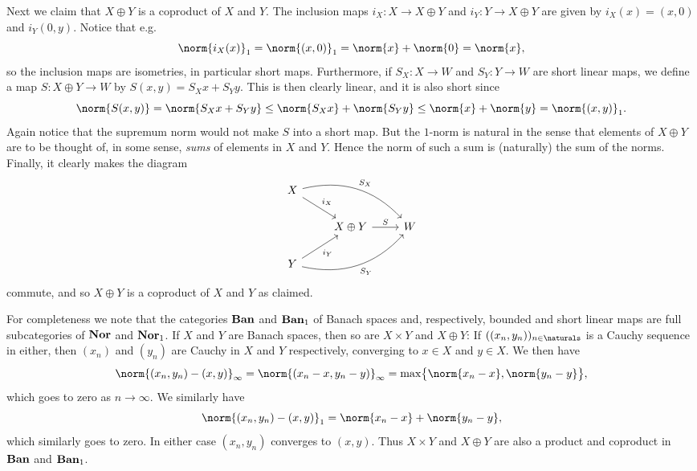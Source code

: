 \documentclass[article, a4paper, 11pt, oneside]{memoir}
\numberwithin{equation}{chapter}
\theoremstyle{nonumberplain}
\begin{document}
\begin{remarkbreak}
	Next we claim that $X \oplus Y$ is a coproduct of $X$ and $Y$. The inclusion maps $i_X \colon X \to X \oplus Y$ and $i_Y \colon Y \to X \oplus Y$ are given by $i_X(x) = (x,0)$ and $i_Y(0,y)$. Notice that e.g.
	\begin{equation*}
		\norm{i_X(x)}_1
			= \norm{(x,0)}_1
			= \norm{x} + \norm{0}
			= \norm{x},
	\end{equation*}
	so the inclusion maps are isometries, in particular short maps. Furthermore, if $S_X \colon X \to W$ and $S_Y \colon Y \to W$ are short linear maps, we define a map $S \colon X \oplus Y \to W$ by $S(x,y) = S_X x + S_Y y$. This is then clearly linear, and it is also short since
	\begin{equation*}
		\norm{S(x,y)}
			= \norm{S_X x + S_Y y}
			\leq \norm{S_X x} + \norm{S_Y y}
			\leq \norm{x} + \norm{y}
			= \norm{(x,y)}_1.
	\end{equation*}
	Again notice that the supremum norm would not make $S$ into a short map. But the $1$-norm is natural in the sense that elements of $X \oplus Y$ are to be thought of, in some sense, \emph{sums} of elements in $X$ and $Y$. Hence the norm of such a sum is (naturally) the sum of the norms. Finally, it clearly makes the diagram
	\begin{equation*}
        \begin{tikzcd}
            X
                \ar[dr, "i_X"]
                \ar[drr, "S_X", bend left] \\
            & X \oplus Y
                \ar[r, "S"]
            & W \\
            Y
                \ar[ur, "i_Y", swap]
                \ar[urr, "S_Y", bend right, swap]
        \end{tikzcd}
    \end{equation*}
	commute, and so $X \oplus Y$ is a coproduct of $X$ and $Y$ as claimed.

	For completeness we note that the categories $\mathbf{Ban}$ and $\mathbf{Ban}_1$ of Banach spaces and, respectively, bounded and short linear maps are full subcategories of $\mathbf{Nor}$ and $\mathbf{Nor}_1$. If $X$ and $Y$ are Banach spaces, then so are $X \times Y$ and $X \oplus Y$: If $((x_n,y_n))_{n\in\naturals}$ is a Cauchy sequence in either, then $(x_n)$ and $(y_n)$ are Cauchy in $X$ and $Y$ respectively, converging to $x \in X$ and $y \in X$. We then have
	\begin{equation*}
		\norm{(x_n,y_n) - (x,y)}_\infty
			= \norm{(x_n - x, y_n - y)}_\infty
			= \max \bigl\{ \norm{x_n - x}, \norm{y_n - y} \bigr\},
	\end{equation*}
	which goes to zero as $n \to \infty$. We similarly have
	\begin{equation*}
		\norm{(x_n,y_n) - (x,y)}_1
			= \norm{x_n - x} + \norm{y_n - y},
	\end{equation*}
	which similarly goes to zero. In either case $(x_n,y_n)$ converges to $(x,y)$. Thus $X \times Y$ and $X \oplus Y$ are also a product and coproduct in $\mathbf{Ban}$ and $\mathbf{Ban}_1$.


\end{remarkbreak}
\end{document}
